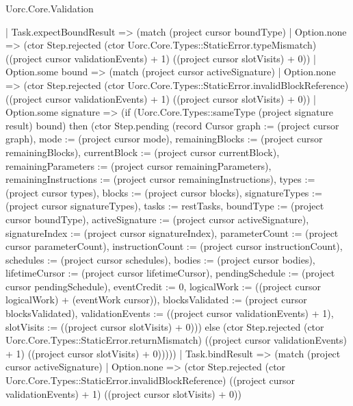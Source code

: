 \begin{lexlean}{Uorc.Core.Validation}
\begin{semanticmodule}
{      | Task.expectBoundResult => (match (project cursor boundType)
        | Option.none => (ctor Step.rejected (ctor Uorc.Core.Types::StaticError.typeMismatch) ((project cursor validationEvents) + 1) ((project cursor slotVisits) + 0))
        | Option.some bound => (match (project cursor activeSignature)
          | Option.none => (ctor Step.rejected (ctor Uorc.Core.Types::StaticError.invalidBlockReference) ((project cursor validationEvents) + 1) ((project cursor slotVisits) + 0))
          | Option.some signature => (if (Uorc.Core.Types::sameType (project signature result) bound) then (ctor Step.pending (record Cursor {graph := (project cursor graph), mode := (project cursor mode), remainingBlocks := (project cursor remainingBlocks), currentBlock := (project cursor currentBlock), remainingParameters := (project cursor remainingParameters), remainingInstructions := (project cursor remainingInstructions), types := (project cursor types), blocks := (project cursor blocks), signatureTypes := (project cursor signatureTypes), tasks := restTasks, boundType := (project cursor boundType), activeSignature := (project cursor activeSignature), signatureIndex := (project cursor signatureIndex), parameterCount := (project cursor parameterCount), instructionCount := (project cursor instructionCount), schedules := (project cursor schedules), bodies := (project cursor bodies), lifetimeCursor := (project cursor lifetimeCursor), pendingSchedule := (project cursor pendingSchedule), eventCredit := 0, logicalWork := ((project cursor logicalWork) + (eventWork cursor)), blocksValidated := (project cursor blocksValidated), validationEvents := ((project cursor validationEvents) + 1), slotVisits := ((project cursor slotVisits) + 0)})) else (ctor Step.rejected (ctor Uorc.Core.Types::StaticError.returnMismatch) ((project cursor validationEvents) + 1) ((project cursor slotVisits) + 0)))))
      | Task.bindResult => (match (project cursor activeSignature)
        | Option.none => (ctor Step.rejected (ctor Uorc.Core.Types::StaticError.invalidBlockReference) ((project cursor validationEvents) + 1) ((project cursor slotVisits) + 0))
}
\end{semanticmodule}
\end{lexlean}
